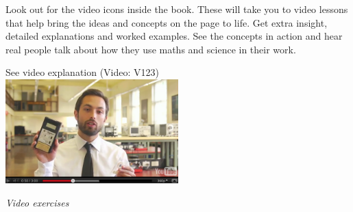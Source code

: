 {\Large

Look out for the video icons inside the book. These will take you to video lessons that help bring the ideas and concepts on the page to life. Get extra insight, detailed explanations and worked examples. See the concepts in action and hear real people talk about how they use maths and science in their work. \par

\begin{center}
See video explanation  (Video: V123)\\
\includegraphics[width=0.5\textwidth]{title_images/veritasiumvideo.png}
\end{center}\par

}
\vspace{0.5cm}
{\normalfont\sffamily\fontsize{22}\normalfont\itshape Video exercises} \par

